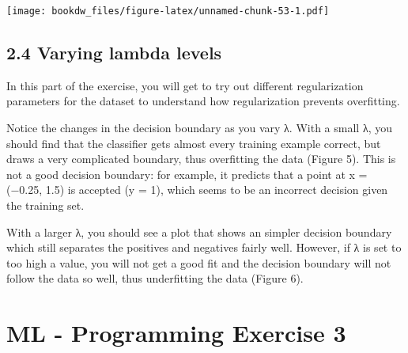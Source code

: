 \documentclass[
]{book}
\newenvironment{Shaded}{\begin{snugshade}}{\end{snugshade}}
\newcommand{\CommentTok}[1]{\textcolor[rgb]{0.56,0.35,0.01}{\textit{#1}}}
\newcommand{\ControlFlowTok}[1]{\textcolor[rgb]{0.13,0.29,0.53}{\textbf{#1}}}
\newcommand{\DataTypeTok}[1]{\textcolor[rgb]{0.13,0.29,0.53}{#1}}
\newcommand{\DecValTok}[1]{\textcolor[rgb]{0.00,0.00,0.81}{#1}}
\newcommand{\KeywordTok}[1]{\textcolor[rgb]{0.13,0.29,0.53}{\textbf{#1}}}
\newcommand{\NormalTok}[1]{#1}
\newcommand{\OperatorTok}[1]{\textcolor[rgb]{0.81,0.36,0.00}{\textbf{#1}}}
\newcommand{\StringTok}[1]{\textcolor[rgb]{0.31,0.60,0.02}{#1}}
\begin{document}
\texttt{[image: bookdw\_files/figure-latex/unnamed-chunk-53-1.pdf]}

\hypertarget{varying-lambda-levels}{%
\section{2.4 Varying lambda levels}\label{varying-lambda-levels}}

In this part of the exercise, you will get to try out different regularization parameters for the dataset to understand how regularization prevents overfitting.

Notice the changes in the decision boundary as you vary λ. With a small λ, you should find that the classifier gets almost every training example correct, but draws a very complicated boundary, thus overfitting the data (Figure 5). This is not a good decision boundary: for example, it predicts that a point at x = (−0.25, 1.5) is accepted (y = 1), which seems to be an
incorrect decision given the training set.

With a larger λ, you should see a plot that shows an simpler decision boundary which still separates the positives and negatives fairly well. However, if λ is set to too high a value, you will not get a good fit and the decision boundary will not follow the data so well, thus underfitting the data (Figure 6).

\begin{Shaded}
\end{Shaded}

\hypertarget{ml---programming-exercise-3}{%
\chapter{ML - Programming Exercise 3}\label{ml---programming-exercise-3}}
\end{document}
